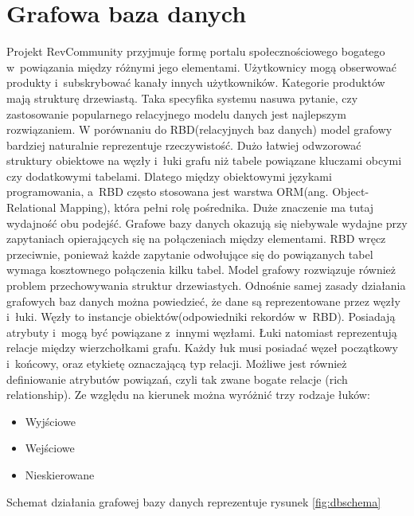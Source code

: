 \section{Grafowa baza danych}

Projekt RevCommunity przyjmuje formę portalu społecznościowego bogatego w~powiązania między różnymi jego elementami. Użytkownicy mogą obserwować produkty i~subskrybować kanały innych użytkowników. Kategorie produktów mają strukturę drzewiastą. Taka specyfika systemu nasuwa pytanie, czy zastosowanie popularnego relacyjnego modelu danych jest najlepszym rozwiązaniem. W porównaniu do RBD(relacyjnych baz danych) model grafowy bardziej naturalnie reprezentuje rzeczywistość. Dużo łatwiej odwzorować struktury obiektowe na węzły i~łuki grafu niż tabele powiązane kluczami obcymi czy dodatkowymi tabelami. Dlatego między obiektowymi językami programowania, a~RBD często stosowana jest warstwa ORM(ang. Object-Relational Mapping), która pełni rolę pośrednika. Duże znaczenie ma tutaj wydajność obu podejść. Grafowe bazy danych okazują się niebywale wydajne przy zapytaniach opierających się na połączeniach między elementami. RBD wręcz przeciwnie, ponieważ każde zapytanie odwołujące się do powiązanych tabel wymaga kosztownego połączenia kilku tabel. Model grafowy rozwiązuje również problem przechowywania struktur drzewiastych.
Odnośnie samej zasady działania grafowych baz danych można powiedzieć, że dane są reprezentowane przez węzły i~łuki. Węzły to instancje obiektów(odpowiedniki rekordów w~RBD). Posiadają atrybuty i~mogą być powiązane z~innymi węzłami. Łuki natomiast reprezentują relacje między wierzchołkami grafu. Każdy łuk musi posiadać węzeł początkowy i~końcowy, oraz etykietę oznaczającą typ relacji. Możliwe jest również definiowanie atrybutów powiązań, czyli tak zwane bogate relacje (rich relationship). Ze względu na kierunek można wyróżnić trzy rodzaje łuków:

\begin{itemize}
\item Wyjściowe
\item Wejściowe
\item Nieskierowane
\end{itemize}

\noindent
Schemat działania grafowej bazy danych reprezentuje rysunek \ref{fig:dbschema}

